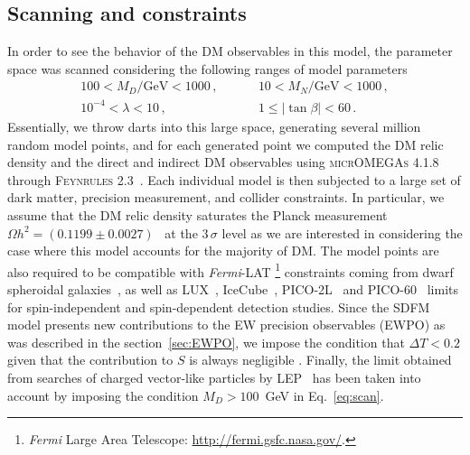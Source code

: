 \subsection{Scanning and constraints}
\label{sec:Parameter-scan}

In order to see the behavior of the DM observables in this model, the parameter space was scanned considering the following ranges of model parameters   
\begin{align}\label{eq:scan}
100<M_D/\text{GeV}<1000 \,, &\hspace{1cm}10 <M_N/\text{GeV}<1000\,,\nonumber\\
10^{-4}<\lambda<10 \,,&\hspace{1cm} 1\leq\left|\tan\beta\right|<60\,.
\end{align}
%
Essentially, we throw darts into this large space, generating several million random model points, and for each generated point we computed the DM relic density and the direct and indirect DM observables using \textsc{micrOMEGAs 4.1.8}~\cite{Belanger:2014vza} through \textsc{Feynrules 2.3}~\cite{Christensen:2008py}. Each individual model is then subjected to a large set of dark matter, precision measurement, and collider constraints. 
In particular, we assume that the DM  relic density saturates the Planck measurement $\Omega h^2=(0.1199 \pm 0.0027)$~\cite{Ade:2013zuv} at the $3\,\sigma$ level as we are interested in considering the case where this model accounts for the majority of DM. The model points are also required to be compatible with \textit{Fermi}-LAT \footnote{\textit{Fermi}  Large Area Telescope: \url{http://fermi.gsfc.nasa.gov/}.} constraints coming from dwarf spheroidal galaxies~\cite{Ackermann:2015zua}, as well as LUX~\cite{Akerib:2013tjd}, IceCube~\cite{2013PhRvL.110m1302A}, PICO-2L~\cite{Amole:2016pye} and PICO-60~\cite{Amole:2015pla}  limits for spin-independent and spin-dependent detection studies. 
Since the SDFM model presents new contributions to the EW precision observables (EWPO) as was described in the section~\ref{sec:EWPO}, we impose the condition that $\Delta T < 0.2$ given that the contribution to $S$ is always negligible \cite{Calibbi:2015nha}.  Finally, the limit obtained from searches of charged vector-like particles by LEP~\cite{ALEPH:2005ab} has been taken into account by imposing the condition $M_D > 100$~GeV in Eq.~\eqref{eq:scan}. 

